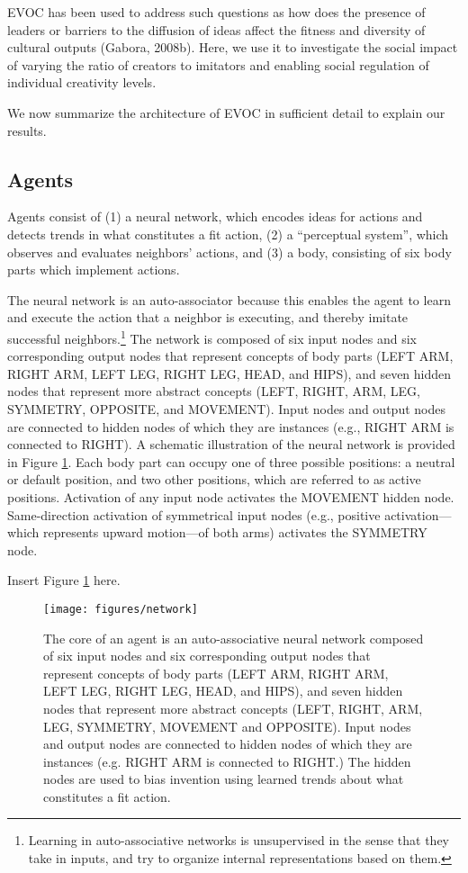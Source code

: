 \documentclass[a4paper,12pt,man,british]{apa6}
\begin{document}
EVOC has been used to address such questions as how does the presence of leaders or barriers to the diffusion of ideas affect the fitness and diversity of cultural outputs (Gabora, 2008b). Here, we use it to investigate the social impact of varying the ratio of creators to imitators and enabling social regulation of individual creativity levels.

We now summarize the architecture of EVOC in sufficient detail to explain our results.

\subsection{Agents}
Agents consist of (1) a neural network, which encodes ideas for actions and detects trends in what constitutes a fit action, (2) a ``perceptual system'', which observes and evaluates neighbors' actions, and (3) a body, consisting of six body parts which implement actions.

The neural network is an auto-associator because this enables the agent to learn and execute the action that a neighbor is executing, and thereby imitate successful neighbors.\footnote{Learning in auto-associative networks is unsupervised in the sense that they take in inputs, and try to organize internal representations based on them.} The network is composed of six input nodes and six corresponding output nodes that represent concepts of body parts (LEFT ARM, RIGHT ARM, LEFT LEG, RIGHT LEG, HEAD, and HIPS), and seven hidden nodes that represent more abstract concepts (LEFT, RIGHT, ARM, LEG, SYMMETRY, OPPOSITE, and MOVEMENT). Input nodes and output nodes are connected to hidden nodes of which they are instances (e.g., RIGHT ARM is connected to RIGHT). A schematic illustration of the neural network is provided in Figure \ref{fig:network}. Each body part can occupy one of three possible positions: a neutral or default position, and two other positions, which are referred to as active positions. Activation of any input node activates the MOVEMENT hidden node. Same-direction activation of symmetrical input nodes (e.g., positive activation---which represents upward motion---of both arms) activates the SYMMETRY node. 

\begin{center} %
Insert Figure \ref{fig:network} here.
\end{center}

\begin{figure}
\centering
\texttt{[image: figures/network]}
\caption{The core of an agent is an auto-associative neural network composed of six input nodes and six corresponding output nodes that represent concepts of body parts (LEFT ARM, RIGHT ARM, LEFT LEG, RIGHT LEG, HEAD, and HIPS), and seven hidden nodes that represent more abstract concepts (LEFT, RIGHT, ARM, LEG, SYMMETRY, MOVEMENT and OPPOSITE). Input nodes and output nodes are connected to hidden nodes of which they are instances (e.g. RIGHT ARM is connected to RIGHT.) The hidden nodes are used to bias invention using learned trends about what constitutes a fit action.}
\label{fig:network}
\end{figure}
 
\end{document}
